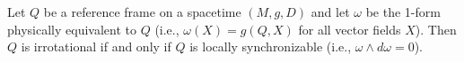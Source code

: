 Let $Q$ be a reference frame on a spacetime $(M, g, D)$ and let $\omega$ be the 1-form physically equivalent to $Q$ (i.e., $\omega(X) = g(Q, X)$ for all vector fields $X$). Then $Q$ is irrotational if and only if $Q$ is locally synchronizable (i.e., $\omega \wedge d\omega = 0$).
